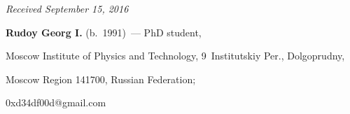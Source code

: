 \vspace*{-6pt}



\hfill{\small\textit{Received September 15, 2016}}



\vspace*{-18pt}



\Contrl



\noindent

\textbf{Rudoy Georg I.} (b.\ 1991)~--- PhD student,

Moscow Institute of Physics and Technology, 9~Institutskiy Per., Dolgoprudny,

Moscow Region 141700, Russian Federation;

\mbox{0xd34df00d@gmail.com}





\label{end\stat}





\renewcommand{\bibname}{\protect\rm Литература} 

